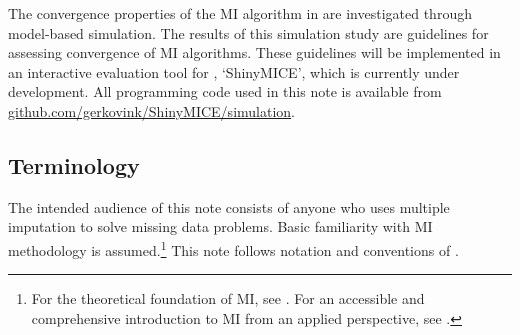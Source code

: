 \documentclass[article]{jss}
\begin{document}

The convergence properties of the MI algorithm in  are investigated through model-based simulation. The results of this simulation study are guidelines for assessing convergence of MI algorithms. These guidelines will be implemented in an interactive evaluation tool for , `ShinyMICE', which is currently under development. All programming code used in this note is available from \href{https://github.com/gerkovink/shinyMice/simulation}{github.com/gerkovink/ShinyMICE/simulation}. 


\subsection{Terminology} \label{sec:terms}

The intended audience of this note consists of anyone who uses multiple imputation to solve missing data problems. Basic familiarity with MI methodology is assumed.\footnote{For the theoretical foundation of MI, see \cite{rubin87}. For an accessible and comprehensive introduction to MI from an applied perspective, see \cite{buur18}.}  
This note follows notation and conventions of  \citep{mice}. %
\end{document}
